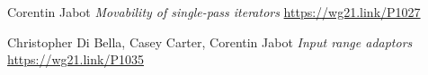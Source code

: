\documentclass{wg21}
\begin{document}
\begin{thebibliography}{9}
	
	Corentin Jabot
	\emph{Movability of single-pass iterators}
	\url{https://wg21.link/P1027}	

	Christopher Di Bella, Casey Carter, Corentin Jabot
	\emph{Input range adaptors}\newline
	\url{https://wg21.link/P1035}	
	
	
\end{thebibliography}
\end{document}
